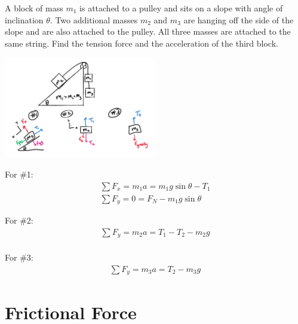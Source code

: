 \begin{problem}
	A block of mass $m_1$ is attached to a pulley and sits on a slope with angle of inclination $\theta$. Two additional masses $m_2$ and $m_3$ are hanging off the side of the slope and are also attached to the pulley. All three masses are attached to the same string. Find the tension force and the acceleration of the third block.

	\begin{center}
		\includegraphics[width=0.5\textwidth]{chapters/ch3/images/fig3_6.PNG}
	\end{center}

	For \#1:
	$$
		\begin{aligned}
			\sum F_x = m_1a = m_1g\sin\theta - T_1\\
			\sum F_y = 0 = F_N - m_1g\sin\theta
		\end{aligned}
	$$

	For \#2:
	$$
		\begin{aligned}
			\sum F_y = m_2a = T_1 - T_2 - m_2g\\
		\end{aligned}
	$$


	For \#3:
	$$
		\begin{aligned}
			\sum F_y = m_3a = T_2 - m_3g
		\end{aligned}
	$$
\end{problem}



\section{Frictional Force}
	
